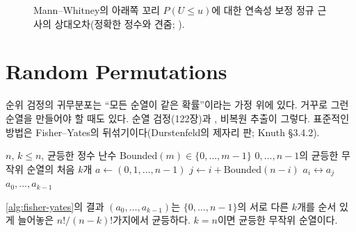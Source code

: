 \begin{figure}[htbp]
\centering
{}
\caption{Mann--Whitney의 아래쪽 꼬리 $P(U\le u)$에 대한 연속성 보정 정규 근사의 상대오차(정확한 정수와 견줌; ).}
\label{fig:normal}
\end{figure}

\section{Random Permutations}
\label{sec:random-perm}

순위 검정의 귀무분포는 ``모든 순열이 같은 확률''이라는 가정 위에 있다. 거꾸로 그런 순열을 만들어야 할 때도 있다. 순열 검정(122장)과 , 비복원 추출이 그렇다. 표준적인 방법은 Fisher--Yates의 뒤섞기이다(Durstenfeld\cite{durstenfeld1964}의 제자리 판; Knuth\cite{knuth1997taocp2} §3.4.2).

\begin{algorithm}[htbp]
\begin{algorithmic}[1]
\Require $n$, $k\le n$, 균등한 정수 난수 \textrm{Bounded}$(m)\in\{0,\dots,m-1\}$
\Ensure $0,\dots,n-1$의 균등한 무작위 순열의 처음 $k$개
\State $a\gets(0,1,\dots,n-1)$ 
  \State $j\gets i+\textrm{Bounded}(n-i)$
  \State $a_i\leftrightarrow a_j$
\EndFor
\State \Return $a_0,\dots,a_{k-1}$
\end{algorithmic}
\caption{Fisher--Yates 뒤섞기의 처음 $k$개 (stardust )}
\label{alg:fisher-yates}
\end{algorithm}

\begin{theorem}
\label{thm:fisher-yates}
\cref{alg:fisher-yates}의 결과 $(a_0,\dots,a_{k-1})$는 $\{0,\dots,n-1\}$의 서로 다른 $k$개를 순서 있게 늘어놓은 $n!/(n-k)!$가지에서 균등하다. $k=n$이면 균등한 무작위 순열이다.
\end{theorem}

